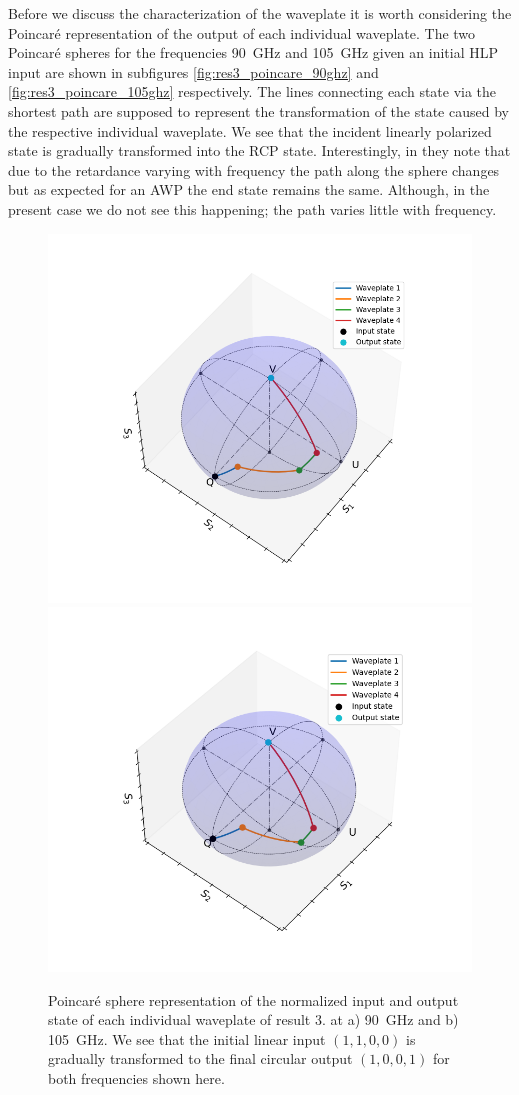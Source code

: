 Before we discuss the characterization of the waveplate it is worth considering the Poincaré representation of the output of each individual waveplate. The two Poincaré spheres for the frequencies \SI{90}{\giga \hertz} and \SI{105}{\giga \hertz} given an initial HLP input are shown in subfigures \ref{fig:res3_poincare_90ghz} and \ref{fig:res3_poincare_105ghz} respectively. The lines connecting each state via the shortest path are supposed to represent the transformation of the state caused by the respective individual waveplate. We see that the incident linearly polarized state is gradually transformed into the RCP state. Interestingly, in \cite{Masson2006} they note that due to the retardance varying with frequency the path along the sphere changes but as expected for an AWP the end state remains the same. Although, in the present case we do not see this happening; the path varies little with frequency. 

\begin{figure}[H]
    \centering
    \subcaptionbox{\label{fig:res3_poincare_90ghz}}
        {\includegraphics[width=0.47\linewidth]{images/5_chapter05/plots/polymer/poincare/Poincare_Res3_90GHz.png}}
    \subcaptionbox{\label{fig:res3_poincare_105ghz}}
        {\includegraphics[width=0.47\linewidth]{images/5_chapter05/plots/polymer/poincare/Poincare_Res3_105GHz.png}}
    \caption{Poincaré sphere representation of the normalized input and output state of each individual waveplate of result 3. at a) \SI{90}{\giga \hertz} and b) \SI{105}{\giga \hertz}. We see that the initial linear input $(1,1,0,0)$ is gradually transformed to the final circular output $(1,0,0,1)$ for both frequencies shown here.}
    \label{fig:res3_poincare}
\end{figure}


